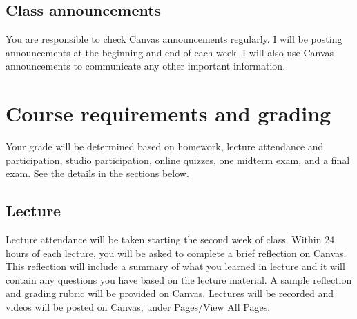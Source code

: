 \documentclass[11pt]{article}
\begin{document}
    
    \subsection{Class announcements}
    
    You are responsible to check Canvas announcements regularly. I will be posting announcements at the beginning and end of each week. I will also use Canvas announcements to communicate any other important information.
    
    
\section{Course requirements and grading}

Your grade will be determined based on homework, lecture attendance and participation, studio participation, 
online quizzes, one midterm exam, and a final exam. See the details in the sections below.

    \subsection{Lecture}
    
    Lecture attendance will be taken starting the second week of class. Within 24 hours of each lecture, you will be asked to complete a brief reflection on Canvas. This reflection will include a summary of what you learned in lecture and it will contain any questions you have based on the lecture material. A sample reflection and grading rubric will be provided on Canvas. Lectures will be recorded and videos will be posted on Canvas, under Pages/View All Pages. 
    
    
\end{document}
